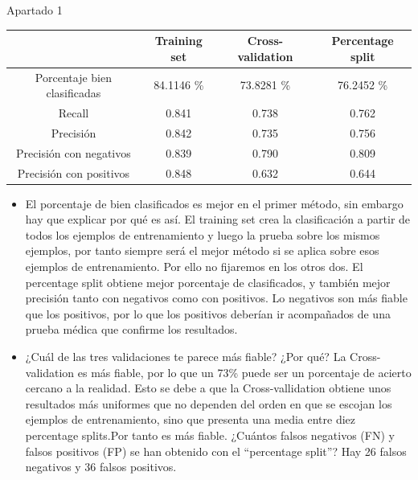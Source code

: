 \documentclass[11pt, a4paper, spanish, openright, twoside]{book}
\begin{document}
\begin{section}{Apartado 1}
\begin{itemize}
		\begin{center}
 			 \begin{tabular}{| c | c | c | c |}
 			   \hline
			     				       	  & Training set 	& Cross-validation 		& Percentage split  \\ \hline
			    Porcentaje bien clasificadas  	  & 84.1146 \% 	& 73.8281 \%		& 76.2452 \% \\ \hline			 
			    Recall 			     	  & 0.841  		& 0.738 			& 0.762 \\ \hline 
			    Precisión			      	  & 0.842  		& 0.735 			& 0.756  \\ \hline \hline
			    Precisión con negativos		  & 0.839		& 0.790			& 0.809 \\ \hline
			    Precisión con positivos 		  & 0.848 		& 0.632			& 0.644 \\ 
			    \hline
			  \end{tabular}
		\end{center}

		\begin{itemize}
			 \item El porcentaje de bien clasificados es mejor en el primer método, sin embargo hay que explicar por qué es así. El training set crea la clasificación a partir de todos los ejemplos de entrenamiento  y luego la prueba sobre 
			los mismos ejemplos, por tanto siempre será el mejor método si se aplica sobre esos ejemplos de entrenamiento. Por ello no fijaremos en los otros dos. El percentage split obtiene mejor porcentaje de clasificados, 
			y también mejor precisión tanto con negativos como con positivos. Lo negativos son más fiable que los positivos, por lo que los positivos deberían ir acompañados de una prueba médica que confirme los resultados.
			\item  ¿Cuál de las tres validaciones te parece 	más fiable? ¿Por qué? La Cross-validation es más fiable, por lo que un 73\% puede ser un porcentaje de acierto cercano a la realidad. Esto se debe a que la Cross-vallidation obtiene 
			unos resultados más uniformes que no dependen del orden en que se escojan los ejemplos de entrenamiento, sino que presenta una media entre diez percentage splits.Por tanto es más fiable.
			 ¿Cuántos falsos negativos (FN) y falsos positivos (FP) se han obtenido con el “percentage split”? Hay 26 falsos negativos y 36 falsos positivos.
		\end{itemize}
	

	\end{itemize}
\end{section}
\end{document}
